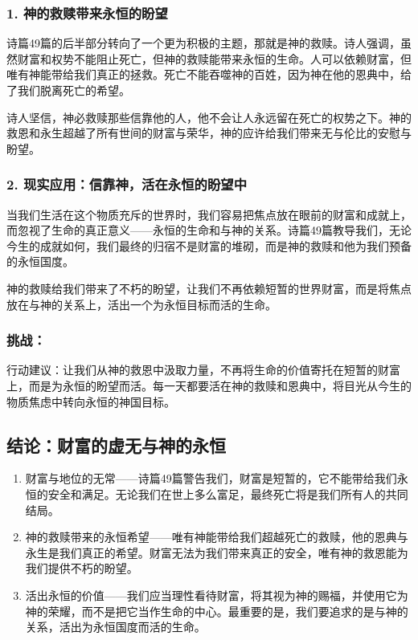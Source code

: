 \documentclass[a4paper, 12pt]{article}
\begin{document}
\subsubsection*{1. 神的救赎带来永恒的盼望}
\hspace{0.6cm}诗篇49篇的后半部分转向了一个更为积极的主题，那就是神的救赎。诗人强调，虽然财富和权势不能阻止死亡，但神的救赎能带来永恒的生命。人可以依赖财富，但唯有神能带给我们真正的拯救。死亡不能吞噬神的百姓，因为神在他的恩典中，给了我们脱离死亡的希望。

诗人坚信，神必救赎那些信靠他的人，他不会让人永远留在死亡的权势之下。神的救恩和永生超越了所有世间的财富与荣华，神的应许给我们带来无与伦比的安慰与盼望。
\subsubsection*{2. 现实应用：信靠神，活在永恒的盼望中}
\hspace{0.6cm}当我们生活在这个物质充斥的世界时，我们容易把焦点放在眼前的财富和成就上，而忽视了生命的真正意义——永恒的生命和与神的关系。诗篇49篇教导我们，无论今生的成就如何，我们最终的归宿不是财富的堆砌，而是神的救赎和他为我们预备的永恒国度。

神的救赎给我们带来了不朽的盼望，让我们不再依赖短暂的世界财富，而是将焦点放在与神的关系上，活出一个为永恒目标而活的生命。
\subsubsection*{挑战：}

行动建议：让我们从神的救恩中汲取力量，不再将生命的价值寄托在短暂的财富上，而是为永恒的盼望而活。每一天都要活在神的救赎和恩典中，将目光从今生的物质焦虑中转向永恒的神国目标。
\subsection*{结论：财富的虚无与神的永恒}
\begin{enumerate}
    \item 财富与地位的无常——诗篇49篇警告我们，财富是短暂的，它不能带给我们永恒的安全和满足。无论我们在世上多么富足，最终死亡将是我们所有人的共同结局。

    \item 神的救赎带来的永恒希望——唯有神能带给我们超越死亡的救赎，他的恩典与永生是我们真正的希望。财富无法为我们带来真正的安全，唯有神的救恩能为我们提供不朽的盼望。

    \item 活出永恒的价值——我们应当理性看待财富，将其视为神的赐福，并使用它为神的荣耀，而不是把它当作生命的中心。最重要的是，我们要追求的是与神的关系，活出为永恒国度而活的生命。

\end{enumerate}
\end{document}
